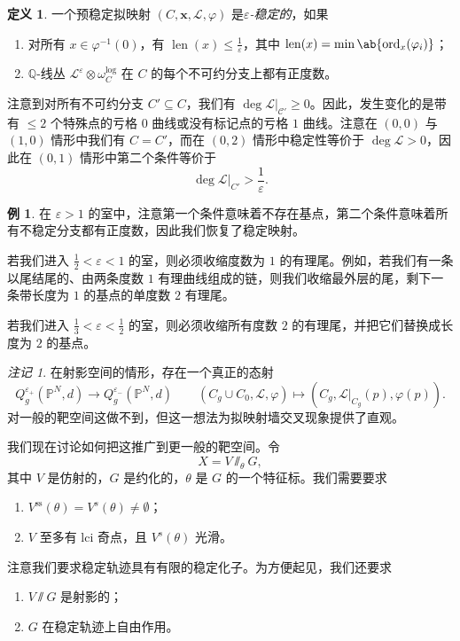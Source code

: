 \documentclass{amsart}
\theoremstyle{definition}
\newtheorem{defn}[thm]{定义}
\newtheorem{exm}[thm]{例}
\theoremstyle{remark}
\newtheorem{rmk}[thm]{注记}
\theoremstyle{plain}
\theoremstyle{definition}
\theoremstyle{remark}
\newcommand{\Q}{\mathbb{Q}}
\renewcommand{\P}{\mathbb{P}}
\newcommand{\ep}{\varepsilon}
\newcommand{\mc}[1]{\mathcal{#1}}
\newcommand{\mr}[1]{\mathrm{#1}}
\newcommand{\on}[1]{\operatorname{#1}}
\newcommand{\1}{\mathbf{1}}
\newcommand{\2}{\mathbf{2}}
\newcommand{\3}{\mathbf{3}}
\begin{document}
\begin{defn}
    一个预稳定拟映射 \((C, \mathbf{x}, \mc{L}, \varphi)\) 是\textit{\(\ep\)-稳定的}，如果
    \begin{enumerate}
        \item 对所有 \(x \in \varphi^{-1}(0)\)，有 \(\on{len}(x) \leq \frac{1}{\ep}\)，其中 \(\on{len}(x) = \min \ab\{ \on{ord}_x (\varphi_i)\}\)；
        \item \(\Q\)-线丛 \(\mc{L}^{\ep} \otimes \omega_C^{\log}\) 在 \(C\) 的每个不可约分支上都有正度数。
    \end{enumerate}
\end{defn}

注意到对所有不可约分支 \(C' \subseteq C\)，我们有 \(\deg \mc{L}|_{\mc{C}'} \geq 0\)。因此，发生变化的是带有 \(\leq 2\) 个特殊点的亏格 \(0\) 曲线或没有标记点的亏格 \(1\) 曲线。注意在 \((0,0)\) 与 \((1,0)\) 情形中我们有 \(C = C'\)，而在 \((0,2)\) 情形中稳定性等价于 \(\deg \mc{L} > 0\)，因此在 \((0,1)\) 情形中第二个条件等价于 
\[ \deg \mc{L}|_{C'} > \frac{1}{\ep}. \]

\begin{exm}
    在 \(\ep > 1\) 的室中，注意第一个条件意味着不存在基点，第二个条件意味着所有不稳定分支都有正度数，因此我们恢复了稳定映射。

    若我们进入 \(\frac{1}{2} < \ep < 1\) 的室，则必须收缩度数为 \(1\) 的有理尾。例如，若我们有一条以尾结尾的、由两条度数 \(1\) 有理曲线组成的链，则我们收缩最外层的尾，剩下一条带长度为 \(1\) 的基点的单度数 \(2\) 有理尾。 

    若我们进入 \(\frac{1}{3} < \ep < \frac{1}{2}\) 的室，则必须收缩所有度数 \(2\) 的有理尾，并把它们替换成长度为 \(2\) 的基点。 
\end{exm}

\begin{rmk}
    在射影空间的情形，存在一个真正的态射
    \[ Q_g^{\ep_+}(\P^N, d) \to Q_g^{\ep_-}(\P^N, d) \qquad (C_g \cup C_0, \mc{L}, \varphi) \mapsto (C_g, \mc{L}|_{C_g}(p), \varphi(p)). \]
    对一般的靶空间这做不到，但这一想法为拟映射墙交叉现象提供了直观。
\end{rmk}

我们现在讨论如何把这推广到更一般的靶空间。令
\[ X = V \sslash_{\theta} G, \]
其中 \(V\) 是仿射的，\(G\) 是约化的，\(\theta\) 是 \(G\) 的一个特征标。我们需要要求
\begin{enumerate}
    \item \(V^{\mr{ss}}(\theta) = V^s(\theta) \neq \emptyset\)；
    \item \(V\) 至多有 lci 奇点，且 \(V^s(\theta)\) 光滑。
\end{enumerate}
注意我们要求稳定轨迹具有有限的稳定化子。为方便起见，我们还要求
\begin{enumerate}
    \item \(V \sslash G\) 是射影的；
    \item \(G\) 在稳定轨迹上自由作用。
\end{enumerate}
\end{document}

